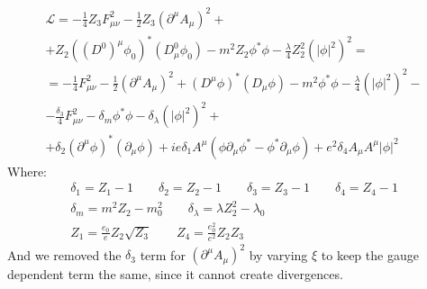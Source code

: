 \documentclass{article}
\begin{document}
\begin{equation}
\begin{gathered}
    \mathcal{L} = -\frac{1}{4}Z_3 F_{\mu\nu}^2 - \frac{1}{2}Z_3\left(\partial^\mu A_\mu\right)^2 + \\ +
    Z_2\left((D^0)^\mu \phi_0\right)^*\left(D^0_\mu \phi_0\right) - m^2 Z_2 \phi^*\phi - \frac{\lambda}{4}Z_2^2\left(\left|\phi\right|^2\right)^2 = \\ =
    -\frac{1}{4}F_{\mu\nu}^2 - \frac{1}{2}\left(\partial^\mu A_\mu\right)^2 + \left(D^\mu \phi\right)^*\left(D_\mu \phi\right) - m^2 \phi^*\phi - \frac{\lambda}{4}\left(\left|\phi\right|^2\right)^2 - \\ -
    \frac{\delta_3}{4}F_{\mu\nu}^2 - \delta_m \phi^*\phi - \delta_\lambda\left(\left|\phi\right|^2\right)^2 + \\ +
    \delta_2\left(\partial^\mu \phi\right)^*\left(\partial_\mu \phi\right) +
    ie\delta_1 A^\mu \left(\phi \partial_\mu \phi^* - \phi^* \partial_\mu \phi \right) + e^2 \delta_{4} A_\mu A^\mu |\phi|^2
\end{gathered}
\end{equation}
Where:
\begin{equation}
\begin{gathered}
    \delta_1 = Z_1 - 1
    \qquad
    \delta_2 = Z_2 - 1
    \qquad
    \delta_3 = Z_3 - 1
    \qquad
    \delta_4 =  Z_4 - 1
    \\
    \delta_m = m^2Z_2 - m_0^2
    \qquad
    \delta_\lambda = \lambda Z_2^2 - \lambda_0
    \\
    Z_1 = \frac{e_0}{e}Z_2 \sqrt{Z_3}
    \qquad
    Z_4 = \frac{e_0^2}{e^2}Z_2Z_3
\end{gathered}
\end{equation}
And we removed the $\delta_3$ term for $\left(\partial^\mu A_\mu\right)^2$ by varying $\xi$ to keep the gauge dependent term the same, since it cannot create divergences.
\end{document}
